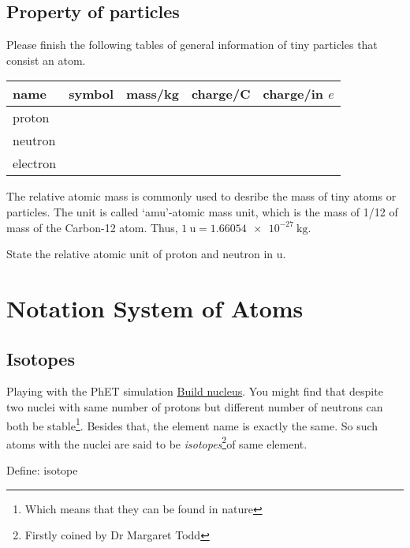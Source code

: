 \documentclass[a4paper]{tufte-handout}
\newenvironment{TaskBox} %
{\begin{tcolorbox}[breakable,colback=b1!30,colframe=b1,title=Task]} {\end{tcolorbox}}
\begin{document}
\subsection{Property of particles}
Please finish the following tables of general information of tiny particles that consist an atom.
\begin{table}[h]
\begin{tabular}{|l|l|l|l|l|}
\hline
name    & symbol & mass/\si{\kg} & charge/\si{\coulomb} &charge/in $e$\\ \hline
proton   &        &      &       & \\ \hline
neutron  &        &      &       & \\ \hline
electron &        &      &       & \\ \hline
\end{tabular}
\end{table}

\begin{TaskBox}
The relative atomic mass is commonly used to desribe the mass of tiny atoms or particles. The unit is called `amu'-atomic mass unit, which is the mass of 1/12 of mass of the Carbon-12 atom. Thus, $\SI{1}{\amu}=\SI{1.66054e-27}{\kg}$.

State the relative atomic unit of proton and neutron in \si{\amu}.
\vspace{1in}
\end{TaskBox}

\section{Notation System of Atoms}
\subsection{Isotopes}
Playing with the PhET simulation \href{https://phet.colorado.edu/sims/html/build-a-nucleus/latest/build-a-nucleus_en.html}{Build nucleus}. You might find that despite two nuclei with same number of protons but different number of neutrons can both be stable\footnote{Which means that they can be found in nature}. Besides that, the element name is exactly the same. So such atoms with the nuclei are said to be \emph{isotopes}\footnote{Firstly coined by Dr Margaret Todd}of same element. 

\begin{TaskBox}
Define: isotope 
\vspace{1in}
\end{TaskBox}
\end{document}

